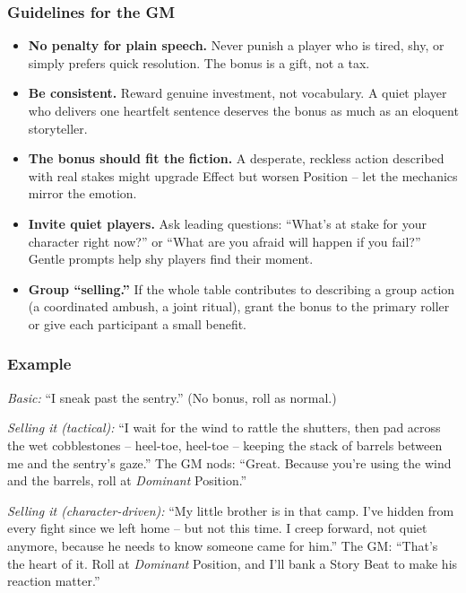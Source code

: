 \subsubsection*{Guidelines for the GM}
\begin{itemize}
  \item \textbf{No penalty for plain speech.} Never punish a player who is tired,
        shy, or simply prefers quick resolution. The bonus is a gift, not a tax.
  \item \textbf{Be consistent.} Reward genuine investment, not vocabulary. A
        quiet player who delivers one heartfelt sentence deserves the bonus as
        much as an eloquent storyteller.
  \item \textbf{The bonus should fit the fiction.} A desperate, reckless action
        described with real stakes might upgrade Effect but worsen Position --
        let the mechanics mirror the emotion.
  \item \textbf{Invite quiet players.} Ask leading questions: ``What's at stake
        for your character right now?'' or ``What are you afraid will happen if
        you fail?'' Gentle prompts help shy players find their moment.
  \item \textbf{Group ``selling.''} If the whole table contributes to describing a
        group action (a coordinated ambush, a joint ritual), grant the bonus to
        the primary roller or give each participant a small benefit.
\end{itemize}

\subsubsection*{Example}
\textit{Basic:} ``I sneak past the sentry.'' (No bonus, roll as normal.)

\textit{Selling it (tactical):} ``I wait for the wind to rattle the shutters, then
pad across the wet cobblestones -- heel-toe, heel-toe -- keeping the stack of
barrels between me and the sentry's gaze.'' The GM nods: ``Great. Because you're
using the wind and the barrels, roll at \textit{Dominant} Position.''

\textit{Selling it (character-driven):} ``My little brother is in that camp.
I've hidden from every fight since we left home -- but not this time. I creep
forward, not quiet anymore, because he needs to know someone came for him.''
The GM: ``That's the heart of it. Roll at \textit{Dominant} Position, and I'll
bank a Story Beat to make his reaction matter.''

